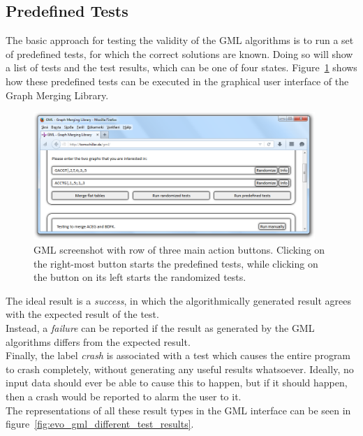 \documentclass[a4paper,12pt,twoside,BCOR=10mm]{scrbook}
\begin{document}
\subsection{Predefined Tests}

The basic approach for testing the validity of the GML algorithms is to run a set
of predefined tests, for which the correct solutions are known. Doing so will
show a list of tests and the test results, which can be one of four states.
Figure~\ref{fig:evo_gml_test_buttons} shows how these predefined tests can be executed in the graphical user interface
of the Graph Merging Library. \\
\begin{figure}[!htb]
\centering
\includegraphics[width=0.95\textwidth]{evo_gml_test_buttons.png}
\caption[GML Test Execution]{GML screenshot with row of three main action buttons. Clicking on the right-most button starts the predefined tests, while clicking on the button on its left starts the randomized tests.} \label{fig:evo_gml_test_buttons}
\end{figure}
The ideal result is a \textit{success}, in which the algorithmically generated result agrees with the
expected result of the test. \\
Instead, a \textit{failure} can be reported if the result as generated by the GML algorithms
differs from the expected result. \\
Finally, the label \textit{crash} is associated with a test which causes the
entire program to crash completely, without generating any useful results whatsoever.
Ideally, no input data should ever be able to cause this to happen,
but if it should happen, then a crash would be reported to alarm the user to it. \\
The representations of all these result types in the GML interface can be seen in figure~\ref{fig:evo_gml_different_test_results}.
\end{document}
